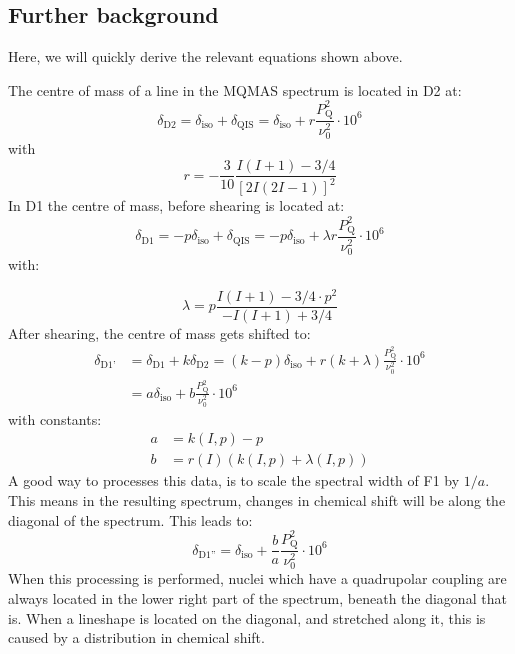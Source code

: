 \documentclass[11pt,a4paper]{article}
\begin{document}
 \subsection{Further background}
 Here, we will quickly derive the relevant equations shown above.

 The centre of mass of a line in the MQMAS spectrum is located in D2 at:
 \begin{equation}
	\delta_\text{D2} = \delta_\text{iso} + \delta_\text{QIS}  =  \delta_\text{iso} + r
	\frac{P_\text{Q}^2}{\nu_0^2} \cdot 10^6
 \end{equation}
 with
 \begin{equation}
	r = -\frac{3}{10}\frac{I(I+1)-3/4}{[2I(2I-1)]^2}
 \end{equation}
 In D1 the centre of mass, before shearing is located at:
 \begin{equation}
	\delta_\text{D1} = -p\delta_\text{iso} + \delta_\text{QIS}  =  -p\delta_\text{iso} +
	\lambda r
	\frac{P_\text{Q}^2}{\nu_0^2} \cdot 10^6
 \end{equation}
 with:

 \begin{equation}
	\lambda = p \frac{I(I+1)-3/4 \cdot p^2}{-I(I+1)+3/4}
 \end{equation}
After shearing, the centre of mass gets shifted to:
 \begin{align}
	\delta_\text{D1'} &= \delta_\text{D1} + k\delta_\text{D2} = (k - p)\delta_\text{iso} +
	r	(k + \lambda) \frac{P_\text{Q}^2}{\nu_0^2} \cdot 10^6 \\
	& = a  \delta_\text{iso} + b \frac{P_\text{Q}^2}{\nu_0^2} \cdot 10^6
 \end{align}
 with constants:
 \begin{align}
	a & = k(I,p) - p \\
	b & = r(I)	(k(I,p) + \lambda(I,p))
 \end{align}
 A good way to processes this data, is to scale the spectral width of F1 by $1/a$.
 This means in the resulting spectrum, changes in chemical shift will be along the diagonal of the spectrum.
This leads to:
\begin{equation}
  \delta_\text{D1''} = \delta_\text{iso} + \frac{b}{a} \frac{P_\text{Q}^2}{\nu_0^2} \cdot 10^6
\end{equation}
When this processing is performed, nuclei which have a quadrupolar coupling are always located in the lower right part of the spectrum, beneath the diagonal that is.
When a lineshape is located on the diagonal, and stretched along it, this is caused by a distribution in chemical shift.
\end{document}
